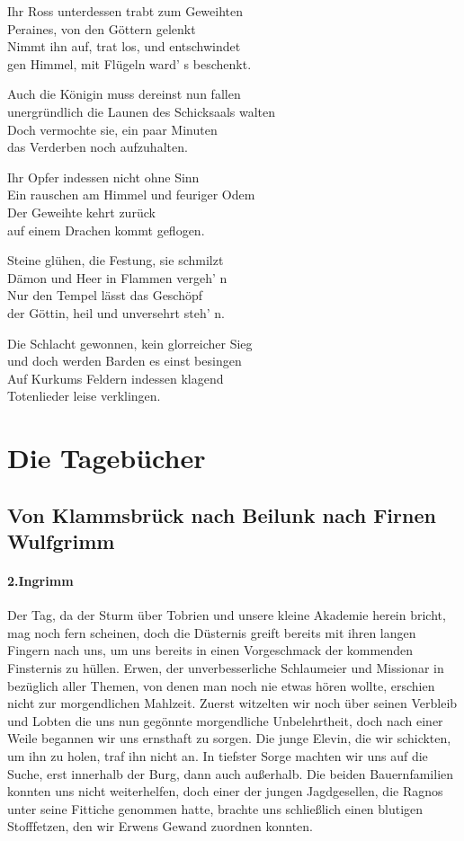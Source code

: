 Ihr Ross unterdessen trabt zum Geweihten\\
Peraines, von den Göttern gelenkt\\
Nimmt ihn auf, trat los, und entschwindet\\
gen Himmel, mit Flügeln ward' s beschenkt.

Auch die Königin muss dereinst nun fallen\\
unergründlich die Launen des Schicksaals walten\\
Doch vermochte sie, ein paar Minuten\\
das Verderben noch aufzuhalten.

Ihr Opfer indessen nicht ohne Sinn\\
Ein rauschen am Himmel und feuriger Odem\\
Der Geweihte kehrt zurück\\
auf einem Drachen kommt geflogen.

Steine glühen, die Festung, sie schmilzt\\
Dämon und Heer in Flammen vergeh' n\\
Nur den Tempel lässt das Geschöpf\\
der Göttin, heil und unversehrt steh' n.

Die Schlacht gewonnen, kein glorreicher Sieg\\
und doch werden Barden es einst besingen\\
Auf Kurkums Feldern indessen klagend\\
Totenlieder leise verklingen.

\section{Die Tagebücher}

\subsection{Von Klammsbrück nach Beilunk nach Firnen Wulfgrimm}

\paragraph{2.Ingrimm}
Der Tag, da der Sturm über Tobrien und unsere kleine Akademie herein bricht, mag noch fern scheinen, doch die Düsternis greift bereits mit ihren langen Fingern nach uns, um uns bereits in einen Vorgeschmack der kommenden Finsternis zu hüllen. Erwen, der unverbesserliche Schlaumeier und Missionar in bezüglich aller Themen, von denen man noch nie etwas hören wollte, erschien nicht zur morgendlichen Mahlzeit. Zuerst witzelten wir noch über seinen Verbleib und Lobten die uns nun gegönnte morgendliche Unbelehrtheit, doch nach einer Weile begannen wir uns ernsthaft zu sorgen. Die junge Elevin, die wir schickten, um ihn zu holen, traf ihn nicht an. In tiefster Sorge machten wir uns auf die Suche, erst innerhalb der Burg, dann auch außerhalb. Die beiden Bauernfamilien konnten uns nicht weiterhelfen, doch einer der jungen Jagdgesellen, die Ragnos unter seine Fittiche genommen hatte, brachte uns schließlich einen blutigen Stofffetzen, den wir Erwens Gewand zuordnen konnten. 

